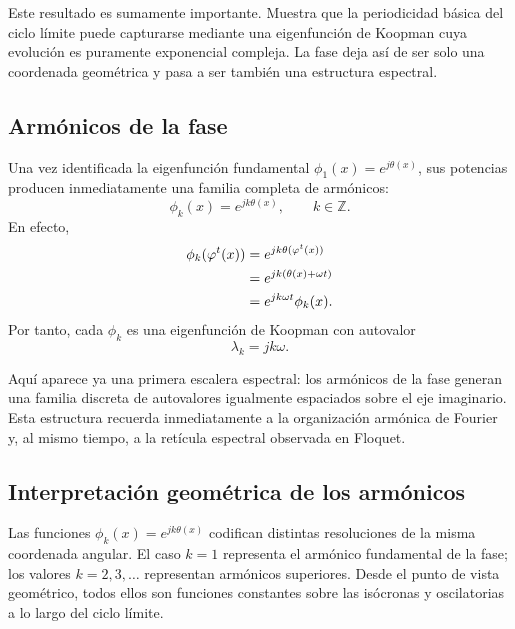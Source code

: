 Este resultado es sumamente importante. Muestra que la periodicidad básica del ciclo límite puede capturarse mediante una eigenfunción de Koopman cuya evolución es puramente exponencial compleja. La fase deja así de ser solo una coordenada geométrica y pasa a ser también una estructura espectral.

\subsection{Armónicos de la fase}

Una vez identificada la eigenfunción fundamental \(\phi_1(x)=e^{j\theta(x)}\), sus potencias producen inmediatamente una familia completa de armónicos:
\begin{equation}
\phi_k(x)=e^{jk\theta(x)},
\qquad
k\in\mathbb{Z}.
\label{eq:Koopman_phase_harmonics}
\end{equation}
En efecto,
\begin{align}
\phi_k(\varphi^t(x))
&=
e^{jk\theta(\varphi^t(x))} \notag\\
&=
e^{jk(\theta(x)+\omega t)} \notag\\
&=
e^{jk\omega t}\phi_k(x).
\label{eq:Koopman_phase_harmonics_evolution}
\end{align}
Por tanto, cada \(\phi_k\) es una eigenfunción de Koopman con autovalor
\begin{equation}
\lambda_k=jk\omega.
\label{eq:Koopman_phase_harmonics_eigenvalues}
\end{equation}

Aquí aparece ya una primera escalera espectral: los armónicos de la fase generan una familia discreta de autovalores igualmente espaciados sobre el eje imaginario. Esta estructura recuerda inmediatamente a la organización armónica de Fourier y, al mismo tiempo, a la retícula espectral observada en Floquet.

\subsection{Interpretación geométrica de los armónicos}

Las funciones \(\phi_k(x)=e^{jk\theta(x)}\) codifican distintas resoluciones de la misma coordenada angular. El caso \(k=1\) representa el armónico fundamental de la fase; los valores \(k=2,3,\dots\) representan armónicos superiores. Desde el punto de vista geométrico, todos ellos son funciones constantes sobre las isócronas y oscilatorias a lo largo del ciclo límite.

